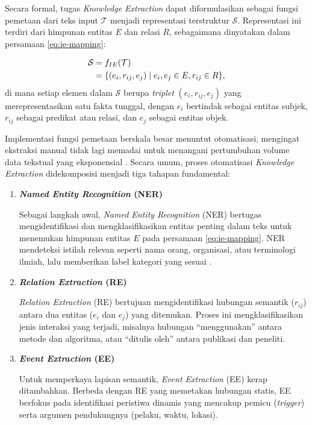 Secara formal, tugas \textit{Knowledge Extraction} dapat diformulasikan sebagai fungsi pemetaan dari teks input \(\mathcal{T}\) menjadi representasi terstruktur \(\mathcal{S}\). Representasi ini terdiri dari himpunan entitas \(E\) dan relasi \(R\), sebagaimana dinyatakan dalam persamaan \eqref{eq:ie-mapping}:

\begin{align}
    \mathcal{S} &= f_{IE}(\mathcal{T}) \notag \\
                &= \{(e_i, r_{ij}, e_j) \mid e_i, e_j \in E, r_{ij} \in R\}, \label{eq:ie-mapping}
\end{align}
di mana setiap elemen dalam \(\mathcal{S}\) berupa \textit{triplet} \((e_i, r_{ij}, e_j)\) yang merepresentasikan satu fakta tunggal, dengan \(e_i\) bertindak sebagai entitas subjek, \(r_{ij}\) sebagai predikat atau relasi, dan \(e_j\) sebagai entitas objek.

Implementasi fungsi pemetaan berskala besar menuntut otomatisasi, mengingat ekstraksi manual tidak lagi memadai untuk menangani pertumbuhan volume data tekstual yang eksponensial \citep{Premasiri2025}. Secara umum, proses otomatisasi \textit{Knowledge Extraction} didekomposisi menjadi tiga tahapan fundamental:

\begin{enumerate}[label=\textbf{\arabic*.}, leftmargin=*, itemsep=10pt]
    \item \textbf{\textit{Named Entity Recognition} (NER)}

          \hspace*{0.75cm} Sebagai langkah awal, \textit{Named Entity Recognition} (NER) bertugas mengidentifikasi dan mengklasifikasikan entitas penting dalam teks untuk menemukan himpunan entitas $E$ pada persamaan \eqref{eq:ie-mapping}. NER mendeteksi istilah relevan seperti nama orang, organisasi, atau terminologi ilmiah, lalu memberikan label kategori yang sesuai \citep{ZHAO2023225}.

    \item \textbf{\textit{Relation Extraction} (RE)}

          \hspace*{0.75cm} \textit{Relation Extraction} (RE) bertujuan mengidentifikasi hubungan semantik (\(r_{ij}\)) antara dua entitas (\(e_i\) dan \(e_j\)) yang ditemukan. Proses ini mengklasifikasikan jenis interaksi yang terjadi, misalnya hubungan ``menggunakan'' antara metode dan algoritma, atau ``ditulis oleh'' antara publikasi dan peneliti.

    \item \textbf{\textit{Event Extraction} (EE)}

          \hspace*{0.75cm} Untuk memperkaya lapisan semantik, \textit{Event Extraction} (EE) kerap ditambahkan. Berbeda dengan RE yang memetakan hubungan statis, EE berfokus pada identifikasi peristiwa dinamis yang mencakup pemicu (\textit{trigger}) serta argumen pendukungnya (pelaku, waktu, lokasi).

\end{enumerate}

